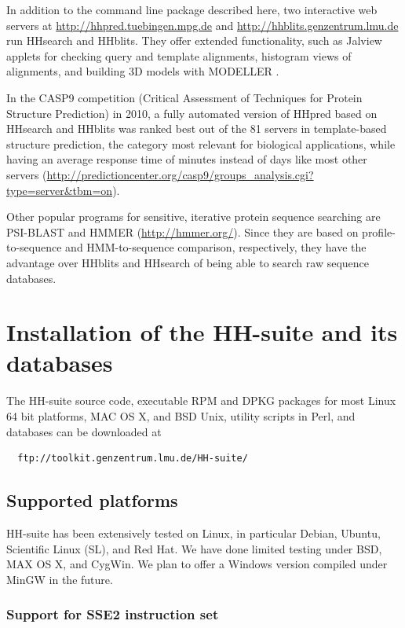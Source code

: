 \documentclass[11pt,a4paper]{article}
\begin{document}
In addition to the command line package described here, two interactive web servers at \url{http://hhpred.tuebingen.mpg.de} \cite{Soding:2005b, Hildebrand:2009} and \url{http://hhblits.genzentrum.lmu.de} run HHsearch and HHblits. They offer extended functionality, such as Jalview applets for checking query and template alignments, histogram views of alignments, and building 3D models with MODELLER \cite{Sali:1993}. 

In the CASP9 competition (Critical Assessment of Techniques for Protein Structure Prediction) in 2010, a fully automated version of HHpred based on HHsearch and HHblits was ranked best out of the 81 servers in template-based structure prediction, the category most relevant for biological applications, while having an average response time of minutes instead of days like most other servers \cite{Mariani:2011} (\url{http://predictioncenter.org/casp9/groups_analysis.cgi?type=server&tbm=on}). 

Other popular programs for sensitive, iterative protein sequence searching are PSI-BLAST \cite{Altschul:1997} and HMMER (\url{http://hmmer.org/}). Since they are based on profile-to-sequence and HMM-to-sequence comparison, respectively, they have the advantage over HHblits and HHsearch of being able to search raw sequence databases.


\section{Installation of the HH-suite and its databases}

The HH-suite source code, executable RPM and DPKG packages for most Linux 64 bit platforms, MAC OS X, and BSD Unix, utility scripts in Perl, and databases can be downloaded at
\begin{verbatim}
  ftp://toolkit.genzentrum.lmu.de/HH-suite/
\end{verbatim}

\subsection{Supported platforms} \label{installation}

HH-suite has been extensively tested on Linux, in particular Debian, Ubuntu, Scientific Linux (SL), and Red Hat. We have done limited testing under BSD, MAX OS X, and CygWin. We plan to offer a Windows version compiled under MinGW in the future.

\subsubsection*{Support for SSE2 instruction set} 
\end{document}
